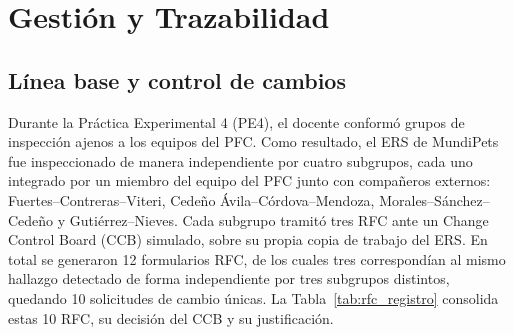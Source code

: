 \documentclass[journal,onecolumn]{IEEEtran}
\begin{document}
\section{Gestión y Trazabilidad}
\label{sec:trazabilidad}

\subsection{Línea base y control de cambios}

Durante la Práctica Experimental 4 (PE4), el docente conformó grupos de
inspección ajenos a los equipos del PFC. Como resultado, el ERS de
MundiPets fue inspeccionado de manera independiente por cuatro
subgrupos, cada uno integrado por un miembro del equipo del PFC junto
con compañeros externos: Fuertes--Contreras--Viteri, Cedeño
Ávila--Córdova--Mendoza, Morales--Sánchez--Cedeño y Gutiérrez--Nieves.
Cada subgrupo tramitó tres RFC ante un Change Control Board (CCB)
simulado, sobre su propia copia de trabajo del ERS. En total se
generaron 12 formularios RFC, de los cuales tres correspondían al mismo
hallazgo detectado de forma independiente por tres subgrupos distintos,
quedando 10 solicitudes de cambio únicas. La Tabla~\ref{tab:rfc_registro}
consolida estas 10 RFC, su decisión del CCB y su justificación.
\end{document}
